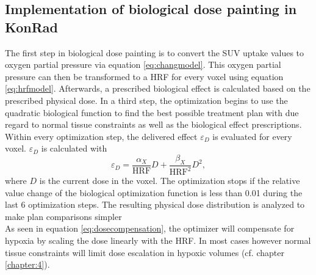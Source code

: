 \subsection{Implementation of biological dose painting in KonRad}
The first step in biological dose painting is to convert the SUV uptake values to oxygen partial pressure via equation \ref{eq:changmodel}. This oxygen partial pressure can then be transformed to a HRF for every voxel using equation \ref{eq:hrfmodel}. Afterwards, a prescribed biological effect is calculated based on the prescribed physical dose. In a third step, the optimization begins to use the quadratic biological function to find the best possible treatment plan with due regard to normal tissue constraints as well as the biological effect prescriptions. Within every optimization step, the delivered effect $\varepsilon_D$  is evaluated for every voxel. $\varepsilon_D$ is calculated with
\begin{equation}
\varepsilon_D = \frac{\alpha_X}{\mathrm{HRF}}D+\frac{\beta_X}{\mathrm{HRF}^2}D^2,
\end{equation}
where $D$ is the current dose in the voxel. The optimization stops if the relative value change of the biological optimization function is less than 0.01 during the last 6 optimization steps. The resulting physical dose distribution is analyzed to make plan comparisons simpler\\As seen in equation \ref{eq:dosecompensation}, the optimizer will compensate for hypoxia by scaling the dose linearly with the HRF. In most cases however normal tissue constraints will limit dose escalation in hypoxic volumes (cf. chapter \ref{chapter:4}).
